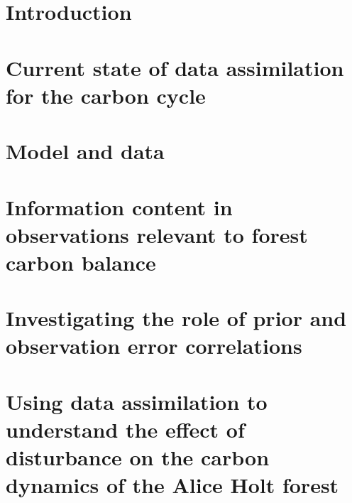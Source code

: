





\tableofcontents


\chapter{Introduction}
\label{chap:intro}


%

\chapter{Current state of data assimilation for the carbon cycle}
\label{chap:litrev}


\chapter{Model and data}
\label{chap:data}


\chapter{Information content in observations relevant to forest carbon balance}
\label{chap:info_con}


\chapter{Investigating the role of prior and observation error correlations}
\label{chap:error_corrs}


\chapter{Using data assimilation to understand the effect of disturbance on the carbon dynamics of the Alice Holt forest}
\label{chap:disturbance}



